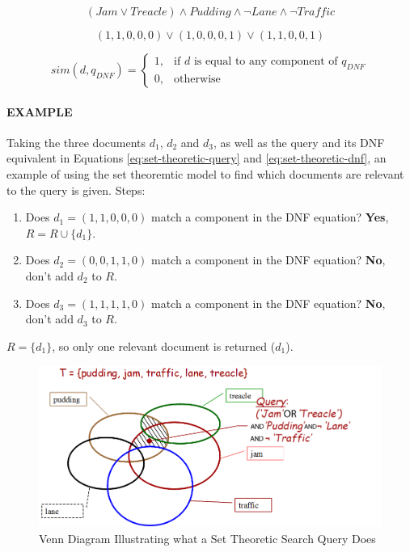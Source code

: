 \documentclass{article}
\begin{document}
\begin{equation}
	(Jam \lor Treacle) \land Pudding \land \neg{Lane} \land \neg{Traffic}
	\label{eq:set-theoretic-query}
\end{equation}

\begin{equation}
	(1, 1, 0, 0, 0) \lor (1, 0, 0, 0, 1) \lor (1, 1, 0, 0, 1)
	\label{eq:set-theoretic-dnf}
\end{equation}

\begin{equation}
	sim(d, q_{DNF}) = \begin{cases}
		1,& \text{if }d\text{ is equal to any component of }q_{DNF} \\
		0,& \text{otherwise}
	\end{cases}
	\label{eq:set-theoretic-similarity}
\end{equation}

\paragraph{\textbf{EXAMPLE}} Taking the three documents $d_1$, $d_2$ and $d_3$, as well as the query and its DNF equivalent in Equations \ref{eq:set-theoretic-query} and \ref{eq:set-theoretic-dnf}, an example of using the set theoremtic model to find which documents are relevant to the query is given. Steps:
\begin{enumerate}
	\item Does $d_1 = (1, 1, 0, 0, 0)$ match a component in the DNF equation? \textbf{Yes}, $R = R \cup \lbrace d_1 \rbrace$.
	\item Does $d_2 = (0, 0, 1, 1, 0)$ match a component in the DNF equation? \textbf{No}, don't add $d_2$ to $R$.
	\item Does $d_3 = (1, 1, 1, 1, 0)$ match a component in the DNF equation? \textbf{No}, don't add $d_3$ to $R$.
\end{enumerate}
$R =  \lbrace d_1 \rbrace$, so only one relevant document is returned ($d_1$).

\begin{figure}[H]
	\centering
	\includegraphics[scale=0.3]{figures/ir-set-theoric-venn1.png}
	\caption{Venn Diagram Illustrating what a Set Theoretic Search Query Does}
	\label{fig:ir-set-theoric-venn1}
\end{figure}
\end{document}
